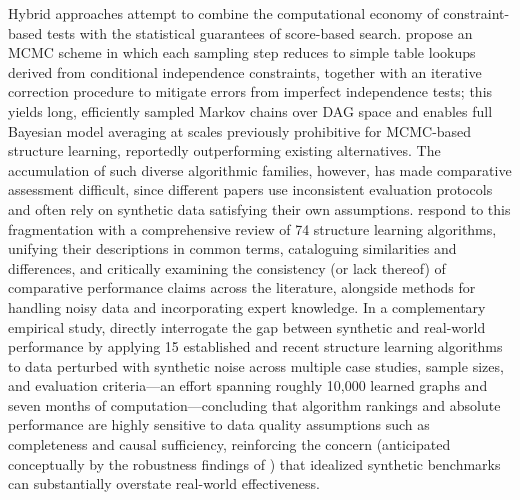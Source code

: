 Hybrid approaches attempt to combine the computational economy of constraint-based tests with the statistical guarantees of score-based search. \cite{kuipers2021efficient} propose an MCMC scheme in which each sampling step reduces to simple table lookups derived from conditional independence constraints, together with an iterative correction procedure to mitigate errors from imperfect independence tests; this yields long, efficiently sampled Markov chains over DAG space and enables full Bayesian model averaging at scales previously prohibitive for MCMC-based structure learning, reportedly outperforming existing alternatives. The accumulation of such diverse algorithmic families, however, has made comparative assessment difficult, since different papers use inconsistent evaluation protocols and often rely on synthetic data satisfying their own assumptions. \cite{kitson2023survey} respond to this fragmentation with a comprehensive review of 74 structure learning algorithms, unifying their descriptions in common terms, cataloguing similarities and differences, and critically examining the consistency (or lack thereof) of comparative performance claims across the literature, alongside methods for handling noisy data and incorporating expert knowledge. In a complementary empirical study, \cite{constantinou2021large} directly interrogate the gap between synthetic and real-world performance by applying 15 established and recent structure learning algorithms to data perturbed with synthetic noise across multiple case studies, sample sizes, and evaluation criteria---an effort spanning roughly 10,000 learned graphs and seven months of computation---concluding that algorithm rankings and absolute performance are highly sensitive to data quality assumptions such as completeness and causal sufficiency, reinforcing the concern (anticipated conceptually by the robustness findings of \cite{henrion2013why}) that idealized synthetic benchmarks can substantially overstate real-world effectiveness.

